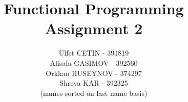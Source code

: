 \documentclass[10pt]{article}
\begin{document}

\author{
	Ulfet CETIN - 391819\\
	Alisafa GASIMOV - 392560\\
	Orkhan HUSEYNOV - 374297\\	
	Shreya KAR - 392325\\
	(names sorted on last name basis)	
}
\title{
	Functional Programming\\
	Assignment 2
}

\maketitle
\end{document}
